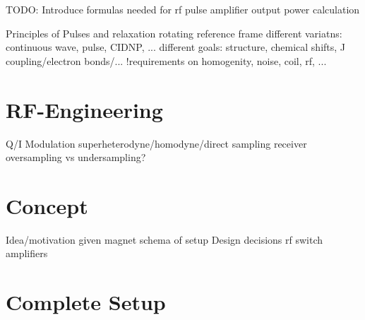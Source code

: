 TODO: Introduce formulas needed for rf pulse amplifier output power calculation

Principles of Pulses and relaxation
rotating reference frame
different variatns: continuous wave, pulse, CIDNP, ...
different goals: structure, chemical shifts, J coupling/electron bonds/...
!requirements on homogenity, noise, coil, rf, ...




\section{RF-Engineering}
Q/I Modulation
superheterodyne/homodyne/direct sampling receiver
oversampling vs undersampling?


\section{Concept}
Idea/motivation
given magnet
schema of setup
Design decisions
rf switch
amplifiers

\section{Complete Setup}

